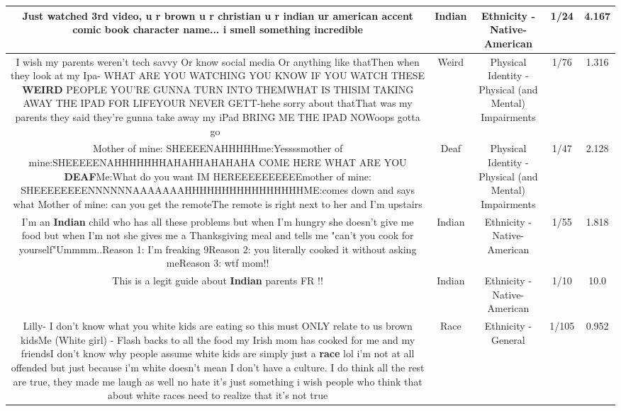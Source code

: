 \documentclass[11pt]{article}
\newlength\mylength
\begin{document}
\begin{center}
\begin{longtable}{|C{.65\mylength}|C{.30\mylength}|C{.12\mylength}|C{.12\mylength}|C{.12\mylength}|}
  \small Just watched 3rd video, u r brown u r christian u r \textbf{indian} ur american accent comic book character name... i smell something incredible\normalsize   & Indian & Ethnicity - Native-American & 1/24 & 4.167 \\  \hline
  \small I wish my parents weren't tech savvy Or know social media Or anything like thatThen when they look at my Ipa- WHAT ARE YOU WATCHING YOU KNOW IF YOU WATCH THESE \textbf{WEIRD} PEOPLE YOU'RE GUNNA TURN INTO THEMWHAT IS THISIM TAKING AWAY THE IPAD FOR LIFEYOUR NEVER GETT-hehe sorry about thatThat was my parents they said they're gunna take away my iPad BRING ME THE IPAD NOWoops gotta go~\normalsize   & Weird & Physical Identity - Physical (and Mental) Impairments & 1/76 & 1.316 \\  \hline
  \small Mother of mine: SHEEEENAHHHHHme:Yessssmother of mine:SHEEEEENAHHHHHHHAHAHHAHAHAHA COME HERE WHAT ARE YOU \textbf{DEAF}Me:What do you want IM HEREEEEEEEEEEmother of mine: SHEEEEEEEENNNNNNAAAAAAAHHHHHHHHHHHHHHHHME:comes down and says what Mother of mine: can you get the remoteThe remote is right next to her and I'm upstairs\normalsize   & Deaf & Physical Identity - Physical (and Mental) Impairments & 1/47 & 2.128 \\  \hline
  \small I'm an \textbf{Indian} child who has all these problems but when I'm hungry she doesn't give me food but when I'm not she gives me a Thanksgiving meal and tells me "can't you cook for yourself"Ummmm..Reason 1: I'm freaking 9Reason 2: you literally cooked it without asking meReason 3: wtf mom!!\normalsize   & Indian & Ethnicity - Native-American & 1/55 & 1.818 \\  \hline
  \small This is a legit guide about \textbf{Indian} parents FR !!\normalsize   & Indian & Ethnicity - Native-American & 1/10 & 10.0 \\  \hline
  \small Lilly- I don't know what you white kids are eating so this must ONLY relate to us brown kidsMe (White girl) -  Flash backs to all the food my Irish mom has cooked for me and my friendsI don't know why people assume white kids are simply just a \textbf{race} lol i'm not at all offended but just because i'm white doesn't mean I don't have a culture. I do think all the rest are true, they made me laugh as well no hate it's just something i wish people who think that about white races need to realize that it's not true\normalsize   & Race & Ethnicity - General & 1/105 & 0.952 \\  \hline

\end{longtable}
\end{center}
\end{document}
